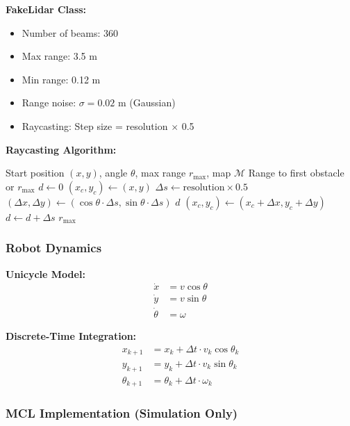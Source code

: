 \documentclass[11pt]{article}
\begin{document}
\textbf{FakeLidar Class:}
\begin{itemize}
    \item Number of beams: 360
    \item Max range: 3.5 m
    \item Min range: 0.12 m
    \item Range noise: $\sigma = 0.02$ m (Gaussian)
    \item Raycasting: Step size = resolution $\times$ 0.5
\end{itemize}

\textbf{Raycasting Algorithm:}
\begin{algorithm}[H]
\caption{Raycast in Occupancy Grid}
\begin{algorithmic}[1]
\Require Start position $(x, y)$, angle $\theta$, max range $r_{\max}$, map $\mathcal{M}$
\Ensure Range to first obstacle or $r_{\max}$
\State $d \gets 0$
\State $(x_c, y_c) \gets (x, y)$
\State $\Delta s \gets \text{resolution} \times 0.5$
\State $(\Delta x, \Delta y) \gets (\cos\theta \cdot \Delta s, \sin\theta \cdot \Delta s)$
        \Return $d$
    \EndIf
    \State $(x_c, y_c) \gets (x_c + \Delta x, y_c + \Delta y)$
    \State $d \gets d + \Delta s$
\EndWhile
\Return $r_{\max}$
\end{algorithmic}
\end{algorithm}

\subsubsection{Robot Dynamics}

\textbf{Unicycle Model:}
\begin{align}
\dot{x} &= v \cos\theta \\
\dot{y} &= v \sin\theta \\
\dot{\theta} &= \omega
\end{align}

\textbf{Discrete-Time Integration:}
\begin{align}
x_{k+1} &= x_k + \Delta t \cdot v_k \cos\theta_k \\
y_{k+1} &= y_k + \Delta t \cdot v_k \sin\theta_k \\
\theta_{k+1} &= \theta_k + \Delta t \cdot \omega_k
\end{align}

\subsubsection{MCL Implementation (Simulation Only)}
\end{document}
